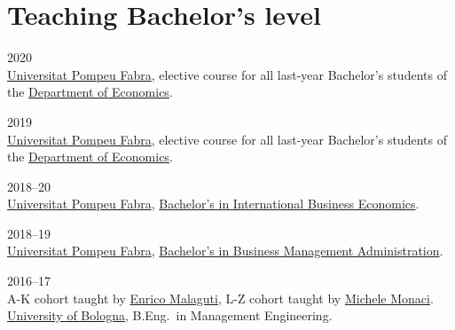 \section*{Teaching \small{Bachelor's level}}

\begin{paracol}{2}
  \textsc{2020}
\switchcolumn
  \\
  \href{https://www.upf.edu/}{Universitat Pompeu Fabra}, elective course for all last-year Bachelor's students of the \href{https://www.upf.edu/web/econ/}{Department of Economics}.
\end{paracol}

\begin{paracol}{2}
  \textsc{2019}
\switchcolumn
  \\
  \href{https://www.upf.edu/}{Universitat Pompeu Fabra}, elective course for all last-year Bachelor's students of the \href{https://www.upf.edu/web/econ/}{Department of Economics}.
\end{paracol}

\begin{paracol}{2}
  \textsc{2018--20}
\switchcolumn
  \\
  \href{https://www.upf.edu/}{Universitat Pompeu Fabra}, \href{https://www.upf.edu/es/web/graus/grau-international-business-economics}{Bachelor's in International Business Economics}.
\end{paracol}

\begin{paracol}{2}
  \textsc{2018--19}
\switchcolumn
  \\
  \href{https://www.upf.edu/}{Universitat Pompeu Fabra}, \href{https://www.upf.edu/es/web/graus/grau-ade}{Bachelor's in Business Management Administration}.
\end{paracol}

\begin{paracol}{2}
  \textsc{2016--17}
\switchcolumn
  \\
  A-K cohort taught by \href{https://scholar.google.com/citations?user=3nD4vYkAAAAJ}{Enrico Malaguti}, L-Z cohort taught by \href{https://scholar.google.com/citations?user=wORMYBMAAAAJ}{Michele Monaci}.\\
  \href{https://www.unibo.it}{University of Bologna}, B.Eng.\ in Management Engineering.
\end{paracol}